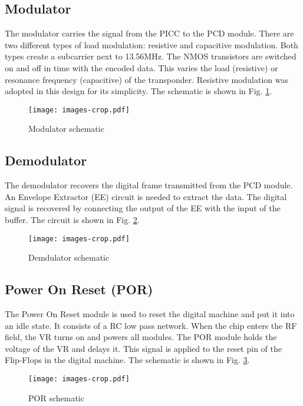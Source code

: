 \subsection{Modulator}

The modulator \cite{rfid_modulador} carries the signal from the PICC to the PCD module. There are two different types of load modulation: resistive and capacitive modulation. Both types create a subcarrier next to 13.56MHz. The NMOS transistors are switched on and off in time with the encoded data. This varies the load (resistive) or resonance frequency  (capacitive) of the transponder.  Resistive modulation was adopted in this design for its simplicity. The schematic is shown in Fig. \ref{fig:mod}.

\begin{figure}[h]
  \centering
  \texttt{[image: images-crop.pdf]}
  \caption{Modulator schematic}
  \label{fig:mod}
\end{figure}

\subsection{Demodulator}

The demodulator recovers the digital frame transmitted from the PCD module. An Envelope Extractor (EE) circuit \cite{rfid_demodulador} is needed to extract the data. The digital signal is recovered by connecting the output of the EE with the input of the buffer. The circuit is shown in Fig. \ref{fig:demod}. 

\begin{figure}[h]
  \centering
  \texttt{[image: images-crop.pdf]}
  \caption{Demdulator schematic}
  \label{fig:demod}
\end{figure}

\subsection{Power On Reset (POR)}

The Power On Reset module is used to reset the digital machine and put it into an idle state. It consists of a RC low pass network. When the chip enters the RF field, the VR turns on and powers all modules. The POR module holds the voltage of the VR and delays it. This signal is applied to the reset pin of the Flip-Flops in the digital machine. The schematic is shown in Fig. \ref{fig:por}. 

\begin{figure}[h]
  \centering
  \texttt{[image: images-crop.pdf]}
  \caption{POR schematic}
  \label{fig:por}
\end{figure}
